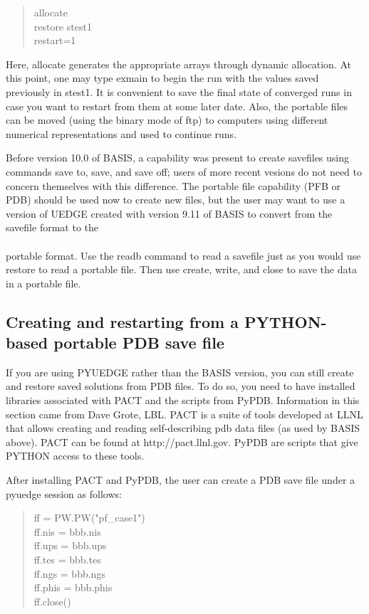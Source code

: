 \documentclass [12pt]{article}
\begin{document}
\begin{verse} \sf
allocate \\
restore stest1 \\
restart=1
\end{verse}
%
Here, allocate generates the appropriate arrays through dynamic allocation.
At this point, one may type {\sf exmain} to begin the run with the values
saved previously in stest1.  It is convenient to save the final state of
converged runs in case you want to restart from them at some later date.
Also, the portable files can be moved (using the binary mode of {\sf ftp}) to
computers using different numerical representations and used to continue runs.

Before version 10.0 of {\sf BASIS}, a capability was present to create
savefiles using commands {\sf save to}, {\sf save}, and {\sf save off}; users
of more recent vesions do not need to concern themselves with this difference.
The portable file capability (PFB or PDB) should be used now to create new
files, but the user may want to use a version of {\sf UEDGE} created with
version 9.11 of {\sf BASIS} to convert from the savefile format to the \\ \\
portable format.  Use the {\sf readb} command to read a savefile just as you
would use {\sf restore} to read a portable file.  Then use {\sf create}, {\sf
  write}, and {\sf close} to save the data in a portable file.

\subsection{Creating and restarting from a {\sf PYTHON}-based portable PDB save file}

If you are using {\sf PYUEDGE} rather than the {\sf BASIS} version,
you can still create and restore saved solutions from PDB files.  To
do so, you need to have installed libraries associated with {\sf PACT}
and the scripts from {\sf PyPDB}.  Information in this section came
from Dave Grote, LBL.  {\sf PACT} is a suite of tools developed at
LLNL that allows creating and reading self-describing pdb data files
(as used by {\sf BASIS} above).  {\sf PACT} can be found at
{\sf http://pact.llnl.gov}.  {\sf PyPDB} are scripts that give
{\sf PYTHON} access to these tools.

After installing {\sf PACT} and {\sf PyPDB}, the user can create a {\sf PDB} save 
file under a pyuedge session as follows:
  \begin{verse} \sf
    ff = PW.PW("pf\_case1") \\
    ff.nis = bbb.nis \\
    ff.ups = bbb.ups \\
    ff.tes = bbb.tes \\
    ff.ngs = bbb.ngs \\
    ff.phis = bbb.phis \\
    ff.close()
  \end{verse}
  
\end{document}
